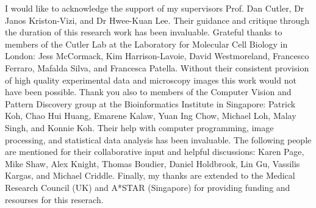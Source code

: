 \begin{acknowledgements}
I would like to acknowledge the support of my supervisors Prof. Dan Cutler, Dr Janos Kriston-Vizi, and Dr Hwee-Kuan Lee. Their guidance and critique through the duration of this research work has been invaluable. Grateful thanks to members of the Cutler Lab at the Laboratory for Molecular Cell Biology in London: Jess McCormack, Kim Harrison-Lavoie, David Westmoreland, Francesco Ferraro, Mafalda Silva, and Francesca Patella. Without their consistent provision of high quality experimental data and microscopy images this work would not have been possible. Thank you also to members of the Computer Vision and Pattern Discovery group at the Bioinformatics Institute in Singapore: Patrick Koh, Chao Hui Huang, Emarene Kalaw, Yuan Ing Chow, Michael Loh, Malay Singh, and Konnie Koh. Their help with computer programming, image processing, and statistical data analysis has been invaluable. The following people are mentioned for their collaborative input and helpful discussions: Karen Page, Mike Shaw, Alex Knight, Thomas Boudier, Daniel Holdbrook, Lin Gu, Vassilis Kargas, and Michael Criddle. Finally, my thanks are extended to the Medical Research Council (UK) and A*STAR (Singapore) for providing funding and resourses for this reserach.
\end{acknowledgements}
